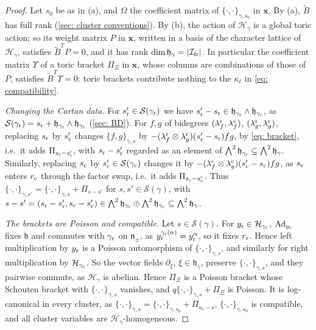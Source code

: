 \documentclass[a4paper]{amsart}
\numberwithin{equation}{section}
\theoremstyle{definition}
\theoremstyle{remark}
\newcommand{\mfh}{\mathfrak{h}}
\newcommand{\mfn}{\mathfrak{n}}
\newcommand{\mcH}{\mathcal{H}}
\newcommand{\mcS}{\mathcal{S}}
\newcommand{\mcI}{\mathcal{I}}
\newcommand{\bx}{\mathbf{x}}
\newcommand{\tB}{\widetilde{B}}
\newcommand{\rr}{{\rm r}}
\newcommand{\cc}{{\rm c}}
\newcommand{\fr}{{\rm fr}}
\newcommand{\toric}{\Pi}
\begin{document}
\begin{proof}
  Let $s_0$ be as in (a), and $\Omega$ the coefficient matrix of $\{\cdot,\cdot\}_{\gamma,s_0}$ in $\bx$.
  By (a), $\tB$ has full rank (\cref{sec: cluster conventions}).
  By (b), the action of $\mcH_\gamma$ is a global toric action; so its weight matrix $P$ in $\bx$, written in a basis of the character lattice of $\mcH_\gamma$, satisfies $\tB^TP=0$, and it has rank $\dim\mfh_\gamma=|\mcI_\fr|$.
  In particular the coefficient matrix $\Upsilon$ of a toric bracket $\toric_\Xi$ in $\bx$, whose columns are combinations of those of $P$, satisfies $\tB^T\Upsilon=0$: toric brackets contribute nothing to the $\kappa_\ell$ in \eqref{eq: compatibility}.

  \emph{Changing the Cartan data.}
  For $s'_{\rr}\in\mcS(\gamma_{\rr})$ we have $s'_{\rr}-s_{\rr}\in\mfh_{\gamma_{\rr}}\wedge\mfh_{\gamma_{\rr}}$, as $\mcS(\gamma_{\rr})=s_{\rr}+\mfh_{\gamma_{\rr}}\wedge\mfh_{\gamma_{\rr}}$ (\cref{sec: BD}).
  For $f,g$ of bidegrees $(\lambda^\rr_f,\lambda^\cc_f)$, $(\lambda^\rr_g,\lambda^\cc_g)$, replacing $s_{\rr}$ by $s'_{\rr}$ changes $\{f,g\}_{\gamma,s}$ by $-(\lambda^\rr_f\otimes\lambda^\rr_g)(s'_{\rr}-s_{\rr})fg$, by \eqref{eq: bracket}, i.e.\ it adds $\toric_{s_{\rr}-s'_{\rr}}$, with $s_{\rr}-s'_{\rr}$ regarded as an element of $\bigwedge^2\mfh_{\gamma_{\rr}}\subseteq\bigwedge^2\mfh_\gamma$.
  Similarly, replacing $s_{\cc}$ by $s'_{\cc}\in\mcS(\gamma_{\cc})$ changes it by $-(\lambda^\cc_f\otimes\lambda^\cc_g)(s'_{\cc}-s_{\cc})fg$, as $s_{\cc}$ enters $r_\cc$ through the factor swap, i.e.\ it adds $\toric_{s_{\cc}-s'_{\cc}}$.
  Thus $\{\cdot,\cdot\}_{\gamma,s'}=\{\cdot,\cdot\}_{\gamma,s}+\toric_{s-s'}$ for $s,s'\in\mcS(\gamma)$, with $s-s'=(s_{\rr}-s'_{\rr},s_{\cc}-s'_{\cc})\in\bigwedge^2\mfh_{\gamma_{\rr}}\oplus\bigwedge^2\mfh_{\gamma_{\cc}}\subseteq\bigwedge^2\mfh_\gamma$.

  \emph{The brackets are Poisson and compatible.}
  Let $s\in\mcS(\gamma)$.
  For $y_{\rr}\in\mcH_{\gamma_{\rr}}$, $\mathrm{Ad}_{y_{\rr}}$ fixes $\mfh$ and commutes with $\gamma_{\rr}$ on $\mfn_\pm$, as $y_{\rr}^{\gamma_{\rr}(\alpha)}=y_{\rr}^\alpha$, so it fixes $r_\rr$. Hence left multiplication by $y_{\rr}$ is a Poisson automorphism of $\{\cdot,\cdot\}_{\gamma,s}$, and similarly for right multiplication by $\mcH_{\gamma_{\cc}}$.
  So the vector fields $\partial_\xi$, $\xi\in\mfh_\gamma$, preserve $\{\cdot,\cdot\}_{\gamma,s}$, and they pairwise commute, as $\mcH_\gamma$ is abelian.
  Hence $\toric_\Xi$ is a Poisson bracket whose Schouten bracket with $\{\cdot,\cdot\}_{\gamma,s}$ vanishes, and $q\{\cdot,\cdot\}_{\gamma,s}+\toric_\Xi$ is Poisson.
  It is log-canonical in every cluster, as $\{\cdot,\cdot\}_{\gamma,s}=\{\cdot,\cdot\}_{\gamma,s_0}+\toric_{s_0-s}$, $\{\cdot,\cdot\}_{\gamma,s_0}$ is compatible, and all cluster variables are $\mcH_\gamma$-homogeneous.


\end{proof}
\end{document}
